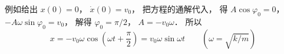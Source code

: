 例如给出 $x(0) = 0$，  $\dot x(0) = v_0$， 把方程的通解代入， 得 $A\cos \varphi_0 = 0$，  $ - A\omega \sin \varphi _0 = v_0$， 解得 $\varphi _0 = {\pi }/{2}$，  $A =  - {v_0}\omega $． 所以
\begin{equation}
x =  - {v_0}\omega \cos (\omega t + \frac{\pi }{2}) = {v_0}\omega \sin \omega t \qquad (\omega  = \sqrt {k/m})
\end{equation}



















